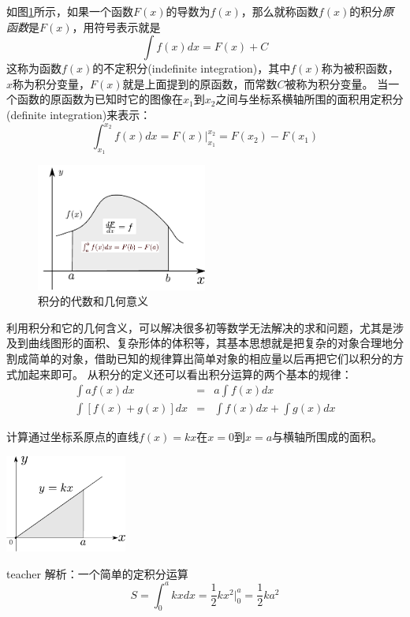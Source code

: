 如图\ref{fig: 微积分-积分的代数和几何意义}所示，如果一个函数$F(x)$的导数为$f(x)$，那么就称函数$f(x)$的积分\emph{原函数}是$F(x)$，用符号表示就是
\begin{equation}
\int f(x)dx =F(x)+C
\end{equation}
这称为函数$f(x)$的{\heiti 不定积分}(indefinite integration)，其中$f(x)$称为被积函数，$x$称为积分变量，$F(x)$就是上面提到的原函数，而常数$C$被称为积分变量。
当一个函数的原函数为已知时它的图像在$x_1$到$x_2$之间与坐标系横轴所围的面积用{\heiti 定积分}(definite integration)来表示：
\begin{equation}
\int_{x_1}^{x_2}f(x)dx = F(x)\bigg|_{x_1}^{x_2}=F(x_2)-F(x_1)
\end{equation}
\begin{figure}[hbtp]
\centering
\includegraphics[width=0.5\textwidth]{images/cal-14.pdf}
\caption{积分的代数和几何意义}\label{fig: 微积分-积分的代数和几何意义}
\end{figure}

利用积分和它的几何含义，可以解决很多初等数学无法解决的求和问题，尤其是涉及到曲线图形的面积、复杂形体的体积等，其基本思想就是把复杂的对象合理地分割成简单的对象，借助已知的规律算出简单对象的相应量以后再把它们以积分的方式加起来即可。
从积分的定义还可以看出积分运算的两个基本的规律：
\begin{eqnarray}
\int a f(x)dx &=& a\int f(x)dx\\
\int [f(x)+g(x)]dx &=&\int f(x)dx +\int g(x)dx
\end{eqnarray}

\begin{example}
计算通过坐标系原点的直线$f(x)=kx$在$x=0$到$x=a$与横轴所围成的面积。
\begin{flushright}
\includegraphics[width=0.3\textwidth]{images/cal-15.pdf} 
\end{flushright}
\begin{taggedblock}{teacher}
\noindent
解析：一个简单的定积分运算
\[
S =\int_0^a kx dx = \frac{1}{2}kx^2\bigg\vert_0^a=\frac{1}{2}ka^2
\]
\end{taggedblock}
\end{example}

